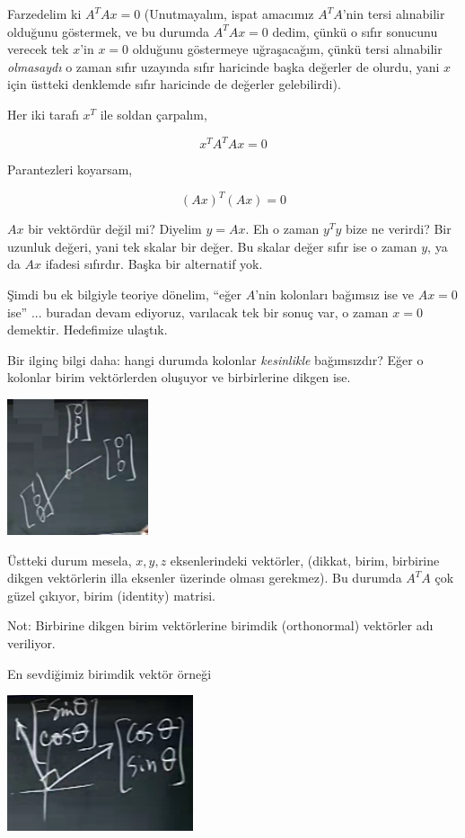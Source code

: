 \documentclass[12pt,fleqn]{article}\usepackage{../../common}
\begin{document}
Farzedelim ki $A^TAx=0$ (Unutmayalım, ispat amacımız $A^TA$'nin tersi
alınabilir olduğunu göstermek, ve bu durumda $A^TAx=0$ dedim, çünkü o sıfır
sonucunu verecek tek $x$'in $x=0$ olduğunu göstermeye uğraşacağım, çünkü
tersi alınabilir {\em olmasaydı} o zaman sıfır uzayında sıfır haricinde
başka değerler de olurdu, yani $x$ için üstteki denklemde sıfır haricinde
de değerler gelebilirdi).

Her iki tarafı $x^T$ ile soldan çarpalım, 

$$ x^TA^TAx = 0 $$

Parantezleri koyarsam, 

$$ (Ax)^T(Ax) = 0 $$

$Ax$ bir vektördür değil mi? Diyelim $y=Ax$. Eh o zaman $y^Ty$ bize ne
verirdi? Bir uzunluk değeri, yani tek skalar bir değer. Bu skalar değer
sıfır ise o zaman $y$, ya da $Ax$ ifadesi sıfırdır. Başka bir alternatif
yok.

Şimdi bu ek bilgiyle teoriye dönelim, ``eğer $A$'nin kolonları bağımsız ise
ve $Ax=0$ ise'' ... buradan devam ediyoruz, varılacak tek bir sonuç var, o
zaman $x=0$ demektir. Hedefimize ulaştık. 

Bir ilginç bilgi daha: hangi durumda kolonlar {\em kesinlikle} bağımsızdır?
Eğer o kolonlar birim vektörlerden oluşuyor ve birbirlerine dikgen ise.

\includegraphics[height=4cm]{16_7.png}

Üstteki durum mesela, $x,y,z$ eksenlerindeki vektörler, (dikkat, birim,
birbirine dikgen vektörlerin illa eksenler üzerinde olması gerekmez). Bu
durumda $A^TA$ çok güzel çıkıyor, birim (identity) matrisi. 

Not: Birbirine dikgen birim vektörlerine birimdik (orthonormal) vektörler
adı veriliyor. 

En sevdiğimiz birimdik vektör örneği 

\includegraphics[height=4cm]{16_8.png}
\end{document}
